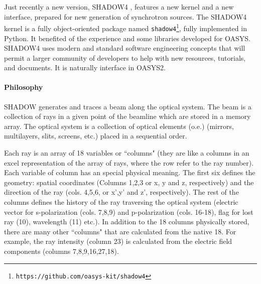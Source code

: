 Just recently a new version, SHADOW4 \cite{shadow4_sri2025}, features a new kernel and a new interface, prepared for new generation of synchrotron sources.
The SHADOW4 kernel is a fully object-oriented package named {\tt shadow4}\footnote{{\tt https://github.com/oasys-kit/shadow4}}, fully implemented in Python. It benefited of the experience and some libraries developed for OASYS.
SHADOW4 uses modern and standard software engineering concepts that will permit a larger community of developers to help with new resources, tutorials, and documents.
It is naturally interface in OASYS2. 



\paragraph{Philosophy}

SHADOW generates and traces a beam along the optical system. The beam is a collection of rays in a given point of the beamline which are stored in a memory array. The optical system is a collection of optical elements (o.e.) (mirrors, multilayers, slits, screens, etc.) placed in a sequential order. 

Each ray is an array of 18 variables or ``columns" (they are like a columns in an excel representation of the array of rays, where the row refer to the ray number).
Each variable of column has an special physical meaning. The first six defines the geometry: spatial coordinates (Columns 1,2,3 or x, y and z, respectively) and the direction of the ray (cols. 4,5,6, or x’,y’ and z’, respectively). The rest of the columns defines the history of the ray traversing the optical system (electric vector for s-polarization (cols. 7,8,9) and p-polarization (cols. 16-18), flag for lost ray (10), wavelength (11) etc.).
In addition to the 18 columns physically stored, there are many other ``columns" that are calculated from the native 18. For example, the ray intensity (column 23) is calculated from the electric field components (columns 7,8,9,16,27,18).

